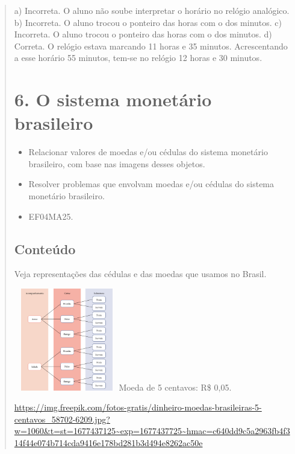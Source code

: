 \begin{enumerate}
\begin{escolha}
\begin{enumerate}
\begin{itemize}
\begin{itemize}
\begin{escolha}
\begin{quote}
a) Incorreta. O aluno não soube interpretar o horário no relógio analógico.
b) Incorreta. O aluno trocou o ponteiro das horas com o dos minutos.
c) Incorreta. O aluno trocou o ponteiro das horas com o dos minutos.
d) Correta. O relógio estava marcando 11 horas e 35 minutos. Acrescentando a esse horário 55 minutos, tem-se no relógio 12 horas e 30 minutos.


\section{6. O sistema monetário brasileiro}\label{muxf3dulo-6}


\begin{itemize}
\item Relacionar valores de moedas e/ou cédulas do sistema monetário
brasileiro, com base nas imagens desses objetos.
\item Resolver problemas que envolvam moedas e/ou cédulas do sistema
monetário brasileiro.
\end{itemize}


\begin{itemize}
  \item EF04MA25.
\end{itemize}

\subsection{Conteúdo}\label{conteuxfado-5}
Veja representações das cédulas e das moedas que usamos no Brasil.

\includegraphics[width=1.80833in,height=1.75637in]{media/image73.png}Moeda
de 5 centavos: R\$ 0,05.

\url{https://img.freepik.com/fotos-gratis/dinheiro-moedas-brasileiras-5-centavos_58702-6209.jpg?w=1060\&t=st=1677437125~exp=1677437725~hmac=c640dd9c5a2963fb4f314f44e074b714cda9416e178bd281b3d494e8262ac50e}


\end{quote}
\end{escolha}
\end{itemize}
\end{itemize}
\end{enumerate}
\end{escolha}
\end{enumerate}
